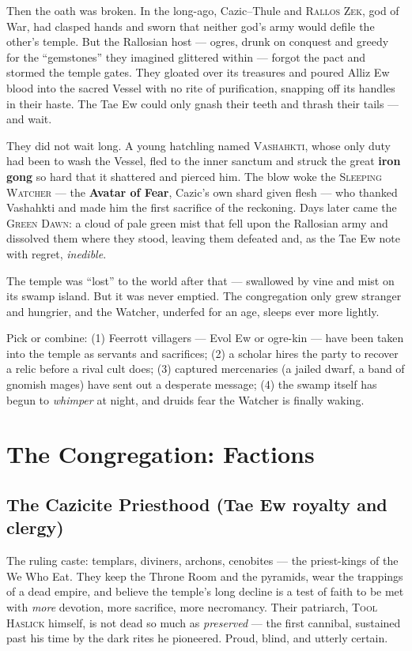 \documentclass[10pt,twoside]{article}
\newcommand{\eqname}[1]{\textsc{#1}}
\begin{document}
Then the oath was broken. In the long-ago, Cazic--Thule and \eqname{Rallos Zek},
god of War, had clasped hands and sworn that neither god's army would defile the
other's temple. But the Rallosian host --- ogres, drunk on conquest and greedy for
the ``gemstones'' they imagined glittered within --- forgot the pact and stormed the
temple gates. They gloated over its treasures and poured Alliz Ew blood into the
sacred Vessel with no rite of purification, snapping off its handles in their
haste. The Tae Ew could only gnash their teeth and thrash their tails --- and wait.

They did not wait long. A young hatchling named \eqname{Vashahkti}, whose only duty
had been to wash the Vessel, fled to the inner sanctum and struck the great
\textbf{iron gong} so hard that it shattered and pierced him. The blow woke the
\eqname{Sleeping Watcher} --- the \textbf{Avatar of Fear}, Cazic's own shard given
flesh --- who thanked Vashahkti and made him the first sacrifice of the reckoning.
Days later came the \eqname{Green Dawn}: a cloud of pale green mist that fell upon
the Rallosian army and dissolved them where they stood, leaving them defeated and,
as the Tae Ew note with regret, \emph{inedible}.

The temple was ``lost'' to the world after that --- swallowed by vine and mist on
its swamp island. But it was never emptied. The congregation only grew stranger and
hungrier, and the Watcher, underfed for an age, sleeps ever more lightly.

\begin{dmnote}
Pick or combine: (1) Feerrott villagers --- Evol Ew or ogre-kin --- have been taken
into the temple as servants and sacrifices; (2) a scholar hires the party to recover
a relic before a rival cult does; (3) captured mercenaries (a jailed dwarf, a band of
gnomish mages) have sent out a desperate message; (4) the swamp itself has begun to
\emph{whimper} at night, and druids fear the Watcher is finally waking.
\end{dmnote}

\section*{The Congregation: Factions}

\subsection*{The Cazicite Priesthood (Tae Ew royalty and clergy)}
The ruling caste: templars, diviners, archons, cenobites --- the priest-kings of
the We Who Eat. They keep the Throne Room and the pyramids, wear the trappings of a
dead empire, and believe the temple's long decline is a test of faith to be met with
\emph{more} devotion, more sacrifice, more necromancy. Their patriarch,
\eqname{Tool Haslick} himself, is not dead so much as \emph{preserved} --- the first
cannibal, sustained past his time by the dark rites he pioneered. Proud, blind, and
utterly certain.
\end{document}
